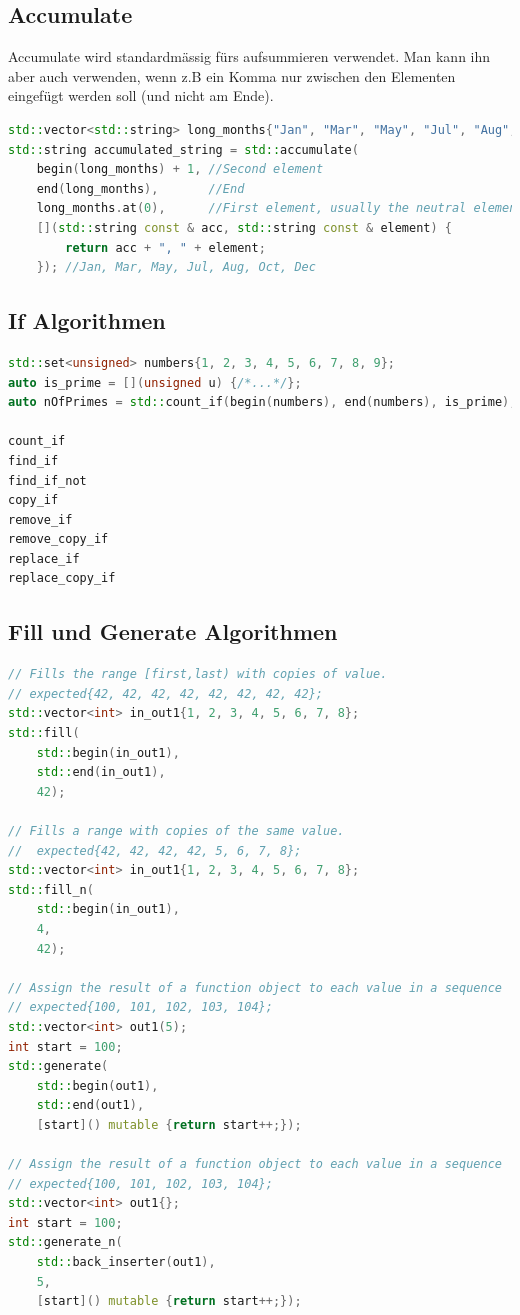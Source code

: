\subsection{Accumulate}
Accumulate wird standardmässig fürs aufsummieren verwendet. Man kann ihn aber auch verwenden, wenn z.B ein Komma nur zwischen den Elementen eingefügt werden soll (und nicht am Ende).
\begin{lstlisting}[language=C++, caption=Accumulate]
std::vector<std::string> long_months{"Jan", "Mar", "May", "Jul", "Aug", "Oct", "Dec"};
std::string accumulated_string = std::accumulate(
	begin(long_months) + 1, //Second element
	end(long_months),       //End
	long_months.at(0),      //First element, usually the neutral element
	[](std::string const & acc, std::string const & element) {
		return acc + ", " + element;
	}); //Jan, Mar, May, Jul, Aug, Oct, Dec
\end{lstlisting}

\newpage
\subsection{If Algorithmen}
\begin{lstlisting}[language=C++, caption=If Algorithmen]
std::set<unsigned> numbers{1, 2, 3, 4, 5, 6, 7, 8, 9};
auto is_prime = [](unsigned u) {/*...*/};
auto nOfPrimes = std::count_if(begin(numbers), end(numbers), is_prime);

count_if
find_if
find_if_not
copy_if
remove_if
remove_copy_if
replace_if
replace_copy_if
\end{lstlisting}

\subsection{Fill und Generate Algorithmen}
\begin{lstlisting}[language=C++, caption=Fill und Generate Algorithmen]
// Fills the range [first,last) with copies of value.
// expected{42, 42, 42, 42, 42, 42, 42, 42};
std::vector<int> in_out1{1, 2, 3, 4, 5, 6, 7, 8};
std::fill(
	std::begin(in_out1),
	std::end(in_out1),
	42);

// Fills a range with copies of the same value.
//  expected{42, 42, 42, 42, 5, 6, 7, 8};
std::vector<int> in_out1{1, 2, 3, 4, 5, 6, 7, 8};
std::fill_n(
	std::begin(in_out1),
	4,
	42);

// Assign the result of a function object to each value in a sequence
// expected{100, 101, 102, 103, 104};
std::vector<int> out1(5);
int start = 100;
std::generate(
	std::begin(out1),
	std::end(out1),
	[start]() mutable {return start++;});

// Assign the result of a function object to each value in a sequence
// expected{100, 101, 102, 103, 104};
std::vector<int> out1{};
int start = 100;
std::generate_n(
	std::back_inserter(out1),
	5,
	[start]() mutable {return start++;});
\end{lstlisting}

